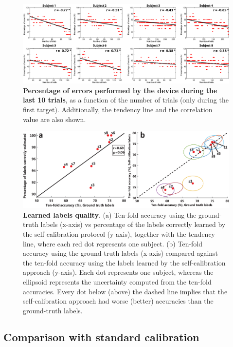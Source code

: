 \begin{figure}[!ht]
		\centering
		\includegraphics[width=\textwidth]{figures/percentage_errors.eps}
		\caption{\label{fig:percentage_errors} \textbf{Percentage of errors performed by the device during the last 10 trials}, as a function of the number of trials (only during the first target). Additionally, the tendency line and the correlation value are also shown.}
\end{figure}


\begin{figure}[!htbp]
\centering
\includegraphics[width=\textwidth]{figures/figure_labels/labels_quality.eps}
\caption{\textbf{Learned labels quality}. (a) Ten-fold accuracy using the ground-truth labels (x-axis) vs percentage of the labels correctly learned by the self-calibration protocol (y-axis), together with the tendency line, where each red dot represents one subject. (b) Ten-fold accuracy using the ground-truth labels (x-axis) compared against the ten-fold accuracy using the labels learned by the self-calibration approach (y-axis). Each dot represents one subject, whereas the ellipsoid represents the uncertainty computed from the ten-fold accuracies. Every dot below (above) the dashed line implies that the self-calibration approach had worse (better) accuracies than the ground-truth labels.}
\label{fig:labels}
\end{figure}

\subsection{Comparison with standard calibration}

